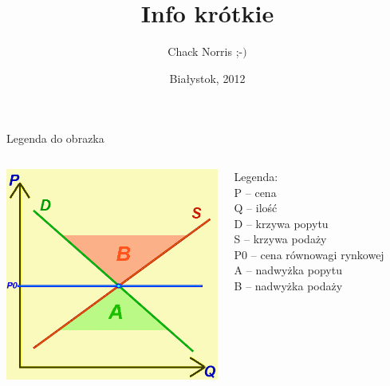 \documentclass[a4paper, 11pt]{beamer}
\title[info]
{
  Info krótkie
}
\author[Gal Anonim]
{
	Chack Norris ;-$)$
}
\institute[UwB]
{
  Uniwersytet w Białymstoku
}
\date[Białystok, 2012]
{
  Białystok, 2012
}
\begin{document}
  \begin{frame}{Legenda do obrazka}
    \begin{columns}
	\includegraphics[width=7cm]{Price_of_market_balance.png}

	Legenda:\\
	P – cena\\
	Q – ilość\\
	D – krzywa popytu\\
	S – krzywa podaży\\
	P0 – cena równowagi rynkowej\\
	A – nadwyżka popytu\\
	B – nadwyżka podaży\\
    \end{columns}
  \end{frame}
\end{document}

